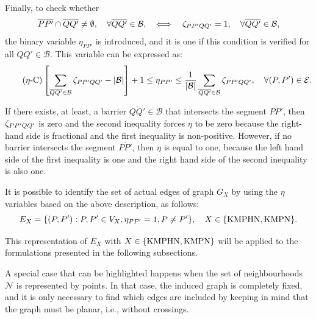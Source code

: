 \documentclass[a4paper,  review, authoryear, 1p.]{elsarticle}
\newcommand{\B}{{\mathcal B}}
\newcommand{\EB}{{E^{}_{\mathcal B}}}
\newcommand{\CV}[1]{{\color{blue}#1}}
\newcommand{\segment}[2]{\overline{#1#2}}
\begin{document}
	\newcommand{\etavar}[2]{\eta_{#1#2}}
	
	Finally, to check whether
	\CV{
	$$\overline{PP'}\cap \overline{QQ'}\neq\emptyset,\quad \forall \overline{QQ'}\in\B,\quad\Longleftrightarrow\quad \zetacheck{P}{P'}{Q}{Q'}=1,\quad\forall \overline{QQ'}\in\B,$$}
	the binary variable $\etavar{P}{P'}$ is introduced, and it is one if this condition is verified for all $\overline{QQ'}\in\B$. This variable can be expressed as: 
	\CV{
	\begin{equation*}\tag{$\eta$-C}\label{eq:etaC}
		\left[\sum_{\overline{QQ'}\in\mathcal B}\zetacheck{P}{P'}{Q}{Q'}-|\mathcal B|\right] + 1\leq \etavar{P}{P'}\leq \frac{1}{|\B|}\sum_{\overline{QQ'}\in\mathcal B}\zetacheck{P}{P'}{Q}{Q'},\quad\forall (P,P')\in\mathcal E.
	\end{equation*}}
	
	If there exists, at least, a barrier $\overline{QQ'}\in\B$ that intersects the segment $\overline{PP'}$, then $\zeta_{PP'QQ'}$ is zero and the second inequality forces $\eta$ to be zero because the right-hand side is fractional and the first inequality is non-positive. However, if no barrier intersects the segment $\segment{P}{P'}$, then $\eta$ is equal to one, because the left hand side of the first inequality is one and the right hand side of the second inequality is also one.
	
	It is possible to identify the set of actual edges of graph $G_X$ by using the $\eta$ variables based on the above description, as follows:
	$$ E_X = \{(P, P'):P,P'\in V_X,\etavar{P}{P'}=1, P\neq P'\}, \quad X\in \{\rm KMPHN, \rm KMPN\}.$$
	
	This representation of $E_X$ with $X\in \{\rm KMPHN, \rm KMPN\}$ will be applied to the formulations presented in the following subsections. 
	
	A special case that can be highlighted happens when the set of neighbourhoods \CV{$\mathcal N$} is represented by points. In that case, the induced graph is completely fixed, and it is only necessary to find which edges are included by keeping in mind that the graph must be planar, i.e., without crossings.
	
\end{document}
